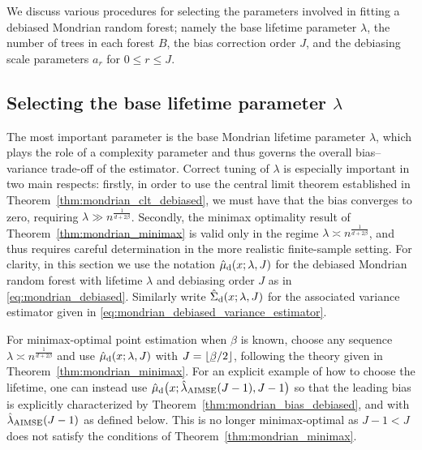 We discuss various procedures for selecting the parameters involved in fitting
a debiased Mondrian random forest; namely the base lifetime parameter
$\lambda$, the number of trees in each forest $B$, the bias correction order
$J$, and the debiasing scale parameters $a_r$ for $0 \leq r \leq J$.

\subsection{Selecting the base lifetime parameter
\texorpdfstring{$\lambda$}{lambda}}%
\label{sec:mondrian_lifetime_selection}

The most important parameter is the base Mondrian lifetime parameter $\lambda$,
which plays the role of a complexity parameter and thus governs the overall
bias--variance trade-off of the estimator. Correct tuning of $\lambda$ is
especially important in two main respects:
%
firstly, in order to use the central limit theorem established in
Theorem~\ref{thm:mondrian_clt_debiased}, we must have that the bias converges
to zero,
requiring $\lambda \gg n^{\frac{1}{d + 2\beta}}$.
%
Secondly, the minimax optimality result of Theorem~\ref{thm:mondrian_minimax}
is valid only in the regime $\lambda \asymp n^{\frac{1}{d + 2\beta}}$, and thus
requires careful determination in the more realistic finite-sample setting. For
clarity, in this section we use the notation $\hat\mu_{\mathrm{d}}(x; \lambda, J)$ for
the debiased Mondrian random forest with lifetime $\lambda$ and debiasing order
$J$ as in \eqref{eq:mondrian_debiased}.
Similarly write $\hat\Sigma_{\mathrm{d}}(x; \lambda, J)$ for the associated
variance estimator given in \eqref{eq:mondrian_debiased_variance_estimator}.

For minimax-optimal point estimation when $\beta$ is known,
choose any sequence $\lambda \asymp n^{\frac{1}{d + 2\beta}}$
and use $\hat\mu_{\mathrm{d}}(x; \lambda, J)$ with $J = \lfloor \flbeta / 2 \rfloor$,
following the theory given in Theorem~\ref{thm:mondrian_minimax}.
For an explicit example of how to choose the lifetime, one can instead use
$\hat\mu_{\mathrm{d}}\big(x; \hat\lambda_{\operatorname{AIMSE}}(J-1), J-1\big)$
so that the leading bias is explicitly characterized by
Theorem~\ref{thm:mondrian_bias_debiased},
and with $\hat\lambda_{\operatorname{AIMSE}}(J-1)$ as defined below.
This is no longer minimax-optimal as $J-1 < J$
does not satisfy the conditions of Theorem~\ref{thm:mondrian_minimax}.

